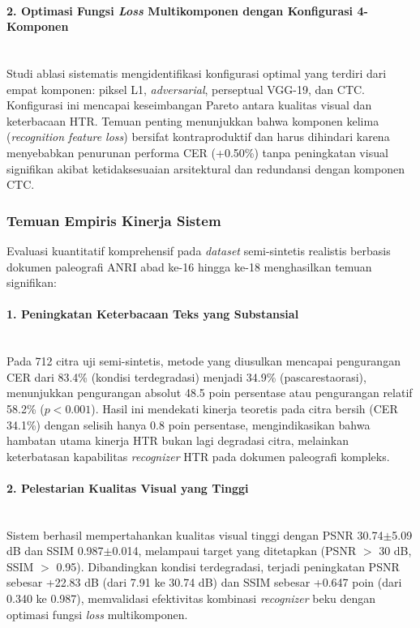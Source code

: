 \documentclass[12pt,a4paper]{article}
\begin{document}
\paragraph{2. Optimasi Fungsi \textit{Loss} Multikomponen dengan Konfigurasi 4-Komponen} \mbox{}\\[0.1em]
Studi ablasi sistematis mengidentifikasi konfigurasi optimal yang terdiri dari empat komponen: piksel L1, \textit{adversarial}, perseptual VGG-19, dan CTC. Konfigurasi ini mencapai keseimbangan Pareto antara kualitas visual dan keterbacaan HTR. Temuan penting menunjukkan bahwa komponen kelima (\textit{recognition feature loss}) bersifat kontraproduktif dan harus dihindari karena menyebabkan penurunan performa CER (+0.50\%) tanpa peningkatan visual signifikan akibat ketidaksesuaian arsitektural dan redundansi dengan komponen CTC.

\vspace{0.8em}

\subsubsection{Temuan Empiris Kinerja Sistem}
\label{subsubsec:temuan-empiris}

Evaluasi kuantitatif komprehensif pada \textit{dataset} semi-sintetis realistis berbasis dokumen paleografi ANRI abad ke-16 hingga ke-18 menghasilkan temuan signifikan:

\paragraph{1. Peningkatan Keterbacaan Teks yang Substansial} \mbox{}\\[0.1em]
Pada 712 citra uji semi-sintetis, metode yang diusulkan mencapai pengurangan CER dari 83.4\% (kondisi terdegradasi) menjadi 34.9\% (pascarestaorasi), menunjukkan pengurangan absolut 48.5 poin persentase atau pengurangan relatif 58.2\% ($p<0.001$). Hasil ini mendekati kinerja teoretis pada citra bersih (CER 34.1\%) dengan selisih hanya 0.8 poin persentase, mengindikasikan bahwa hambatan utama kinerja HTR bukan lagi degradasi citra, melainkan keterbatasan kapabilitas \textit{recognizer} HTR pada dokumen paleografi kompleks.

\paragraph{2. Pelestarian Kualitas Visual yang Tinggi} \mbox{}\\[0.1em]
Sistem berhasil mempertahankan kualitas visual tinggi dengan PSNR 30.74$\pm$5.09 dB dan SSIM 0.987$\pm$0.014, melampaui target yang ditetapkan (PSNR $>$ 30 dB, SSIM $>$ 0.95). Dibandingkan kondisi terdegradasi, terjadi peningkatan PSNR sebesar +22.83 dB (dari 7.91 ke 30.74 dB) dan SSIM sebesar +0.647 poin (dari 0.340 ke 0.987), memvalidasi efektivitas kombinasi \textit{recognizer} beku dengan optimasi fungsi \textit{loss} multikomponen.
\end{document}

